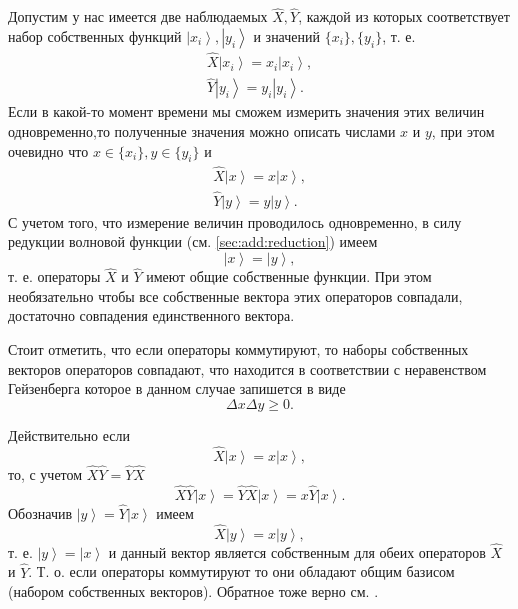 Допустим у нас имеется две наблюдаемых $\hat{X}, \hat{Y}$, каждой из
которых соответствует набор собственных функций $\left|x_i\right>,
\left|y_i\right>$ и значений $\{x_i\}, \{y_i\}$, т. е.
\begin{eqnarray}
  \hat{X}\left|x_i\right> = x_i \left|x_i\right>,
  \nonumber \\
  \hat{Y}\left|y_i\right> = y_i \left|y_i\right>.
  \nonumber
\end{eqnarray}
Если в какой-то момент времени мы сможем измерить значения этих
величин одновременно,то полученные значения можно описать числами $x$
и $y$, при этом очевидно что $x \in \{x_i\}, y \in \{y_i\}$ и
\begin{eqnarray}
  \hat{X}\left|x\right> = x \left|x\right>,
  \nonumber \\
  \hat{Y}\left|y\right> = y \left|y\right>.
  \nonumber
\end{eqnarray}
С учетом того, что измерение величин проводилось одновременно, в силу
редукции волновой функции (см. \autoref{sec:add:reduction}) имеем
\[
\left|x\right> = \left|y\right>,
\]
т. е. операторы $\hat{X}$ и $\hat{Y}$ имеют общие собственные
функции. При этом необязательно чтобы все собственные вектора этих
операторов совпадали, достаточно совпадения единственного вектора.

Стоит отметить, что если операторы коммутируют, то наборы собственных
векторов операторов совпадают, что находится в соответствии с
неравенством Гейзенберга которое в данном случае запишется в виде
\[
\Delta x \Delta y \ge 0.
\]

Действительно если
\[
\hat{X} \left|x\right> = x \left|x\right>, 
\]
то, с учетом $\hat{X}\hat{Y} = \hat{Y}\hat{X}$
\[
\hat{X}\hat{Y}\left|x\right> = 
\hat{Y}\hat{X}\left|x\right> =
x \hat{Y}\left|x\right>.
\]
Обозначив $\left|y\right> = \hat{Y}\left|x\right>$ имеем
\[
\hat{X}\left|y\right> = 
x \left|y\right>,
\]
т. е.
$\left|y\right> = \left|x\right>$ и данный вектор является собственным
для обеих операторов $\hat{X}$ и  $\hat{Y}$. Т. о. если операторы
коммутируют то они обладают общим базисом (набором собственных
векторов). Обратное тоже верно см. \cite{bHolevo2016}.
